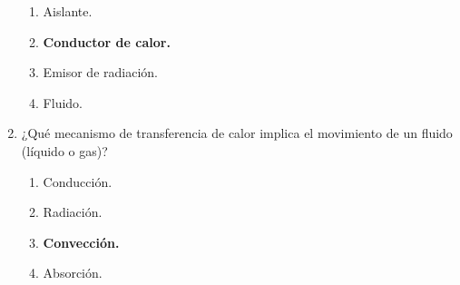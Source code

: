 \documentclass{article}
\begin{document}
\begin{enumerate}[label=\arabic*.]
		\begin{enumerate}[label=\alph*)]
			\item Aislante.
			\item \textbf{Conductor de calor.}
			\item Emisor de radiación.
			\item Fluido.
		\end{enumerate}
			
	    \item ¿Qué mecanismo de transferencia de calor implica el movimiento de un fluido (líquido o gas)?
			\begin{enumerate}[label=\alph*)]
				\item Conducción.
				\item Radiación.
				\item \textbf{Convección.}
				\item Absorción.
			\end{enumerate}
			
	\end{enumerate}
	
\end{document}
